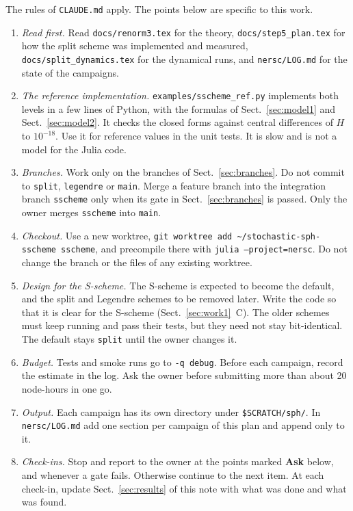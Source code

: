 \documentclass[11pt,aps,preprint,nofootinbib,superscriptaddress,tightenlines]{revtex4-2}
\def\Sect#1{Sect.~\ref{#1}}
\begin{document}
The rules of \nolinkurl{CLAUDE.md} apply.  The points below are specific to this work.
\begin{enumerate}
\item \emph{Read first.}  Read \nolinkurl{docs/renorm3.tex} for the theory, \nolinkurl{docs/step5_plan.tex} for how the split scheme was implemented
  and measured, \nolinkurl{docs/split_dynamics.tex} for the dynamical runs, and \nolinkurl{nersc/LOG.md} for the state of the campaigns.
\item \emph{The reference implementation.}  \nolinkurl{examples/sscheme_ref.py} implements both levels in a few lines of Python, with the formulas of
  \Sect{sec:model1} and \Sect{sec:model2}.  It checks the closed forms against central differences of $H$ to $10^{-18}$.  Use it for reference values in
  the unit tests.  It is slow and is not a model for the Julia code.
\item \emph{Branches.}  Work only on the branches of \Sect{sec:branches}.  Do not commit to \texttt{split}, \texttt{legendre} or \texttt{main}.  Merge a
  feature branch into the integration branch \texttt{sscheme} only when its gate in \Sect{sec:branches} is passed.  Only the owner merges
  \texttt{sscheme} into \texttt{main}.
\item \emph{Checkout.}  Use a new worktree, \texttt{git worktree add \textasciitilde/stochastic-sph-sscheme sscheme}, and precompile there with
  \texttt{julia --project=nersc}.  Do not change the branch or the files of any existing worktree.
\item \emph{Design for the S-scheme.}  The S-scheme is expected to become the default, and the split and Legendre schemes to be removed later.  Write
  the code so that it is clear for the S-scheme (\Sect{sec:work1}~C).  The older schemes must keep running and pass their tests, but they need not
  stay bit-identical.  The default stays \texttt{split} until the owner changes it.
\item \emph{Budget.}  Tests and smoke runs go to \texttt{-q debug}.  Before each campaign, record the estimate in the log.  Ask the owner before
  submitting more than about 20 node-hours in one go.
\item \emph{Output.}  Each campaign has its own directory under \texttt{\$SCRATCH/sph/}.  In \nolinkurl{nersc/LOG.md} add one section per campaign of
  this plan and append only to it.
\item \emph{Check-ins.}  Stop and report to the owner at the points marked \textbf{Ask} below, and whenever a gate fails.  Otherwise continue to the
  next item.  At each check-in, update \Sect{sec:results} of this note with what was done and what was found.
\end{enumerate}
\end{document}
